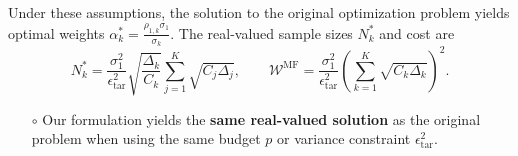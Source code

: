 \documentclass{beamer}
\begin{document}
\begin{frame}[t]
{\begin{theorem}
        \vspace{-3mm}
        Under these assumptions, the solution to the original optimization problem  yields optimal weights $\alpha_k^*=\frac{\rho_{1,k}\sigma_1}{\sigma_k}$.
        The real-valued sample sizes $N_k^*$ and cost are
        \vspace{-3mm}
        \[
        N_k^*=\frac{\sigma_1^2}{\epsilon_\text{tar}^2}\sqrt{\frac{\Delta_{k}}{C_k}}\sum_{j=1}^K\sqrt{C_j\Delta_{j}}, \qquad \mathcal{W}^\text{MF} = \frac{\sigma_1^2}{\epsilon_{\text{tar}}^2}\left(\sum_{k=1}^K\sqrt{C_k\Delta_{k}}\right)^2.
        \] 
        \end{theorem}
        }
        {\footnotesize
        \begin{itemize}[leftmargin=5pt] 
            \item[$\circ$] \textcolor{myblue3}{Our formulation yields the {\bf same real-valued solution} as the original problem when using the same budget $p$ or variance constraint $\epsilon_{\text{tar}}^2$.} 
        \end{itemize}
        }
\end{frame}
\end{document}
